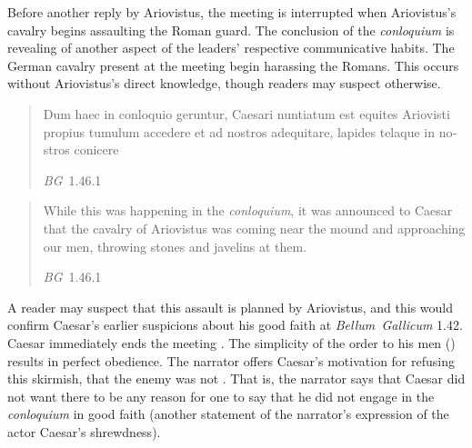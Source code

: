 \documentclass[12pt,letterpaper,oneside,final]{memoir}
\begin{document}
Before another reply by Ariovistus, the meeting is interrupted when Ariovistus's cavalry begins assaulting the Roman guard. The conclusion of the \emph{conloquium} is revealing of another aspect of the leaders' respective communicative habits. The German cavalry present at the meeting begin harassing the Romans. This occurs without Ariovistus's direct knowledge, though readers may suspect otherwise. \blockquote[\emph{BG}~1.46.1]{\textlatin{Dum haec in conloquio geruntur, Caesari nuntiatum est equites Ariovisti propius tumulum accedere et ad nostros adequitare, lapides telaque in nostros conicere}}. \blockquote[\emph{BG}~1.46.1]{While this was happening in the \emph{conloquium}, it was announced to Caesar that the cavalry of Ariovistus was coming near the mound and approaching our men, throwing stones and javelins at them.} A reader may suspect that this assault is planned by Ariovistus, and this would confirm Caesar's earlier suspicions about his good faith at \emph{Bellum~Gallicum} 1.42. Caesar immediately ends the meeting . The simplicity of the order to his men () results in perfect obedience. The narrator offers Caesar's motivation for refusing this skirmish, that the enemy was not . That is, the narrator says that Caesar did not want there to be any reason for one to say that he did not engage in the \emph{conloquium} in good faith (another statement of the narrator's expression of the actor Caesar's shrewdness).
\end{document}
